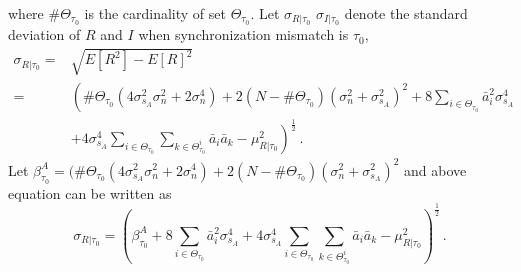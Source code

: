 where $\#\Theta_{\tau_0}$ is the cardinality of set $\Theta_{\tau_0}$. 
Let $\sigma_{R|\tau_0}$ $\sigma_{I|\tau_0}$ denote the standard deviation of $R$ and $I$ when synchronization mismatch is $\tau_0$, 
\begin{equation}
  \begin{split}
	\sigma_{R|\tau_0} = &\sqrt{E[R^2] - E[R]^2}\\
	= &\left(\#\Theta_{\tau_0}(4\sigma_{s_A}^2\sigma_n^2+2\sigma_n^4) + 2(N - \#\Theta_{\tau_0})(\sigma_n^2+\sigma_{s_A}^2)^2 +  8\sum_{i\in\Theta_{\tau_0}}\bar{a}_i^2\sigma_{s_A}^4 \right.\\
  &\left.+ 4\sigma_{s_A}^4\sum_{i\in\Theta_{\tau_0}}\sum_{k\in\Theta_{\tau_0}^i}\bar{a}_i\bar{a}_k- \mu_{R|\tau_0}^2\right)^\frac{1}{2}\,.
  \end{split}
  \label{deviationR}
\end{equation}
Let $\beta_{\tau_0}^A = (\#\Theta_{\tau_0}(4\sigma_{s_A}^2\sigma_n^2+2\sigma_n^4) + 2(N - \#\Theta_{\tau_0})(\sigma_n^2+\sigma_{s_A}^2)^2$ and above equation can be written as
\begin{equation}
  \sigma_{R|\tau_0} = \left(\beta_{\tau_0}^A+  8\sum_{i\in\Theta_{\tau_0}}\bar{a}_i^2\sigma_{s_A}^4 
    + 4\sigma_{s_A}^4\sum_{i\in\Theta_{\tau_0}}\sum_{k\in\Theta_{\tau_0}^i}\bar{a}_i\bar{a}_k- \mu_{R|\tau_0}^2\right)^\frac{1}{2}\,.
  \label{devR}
\end{equation}

